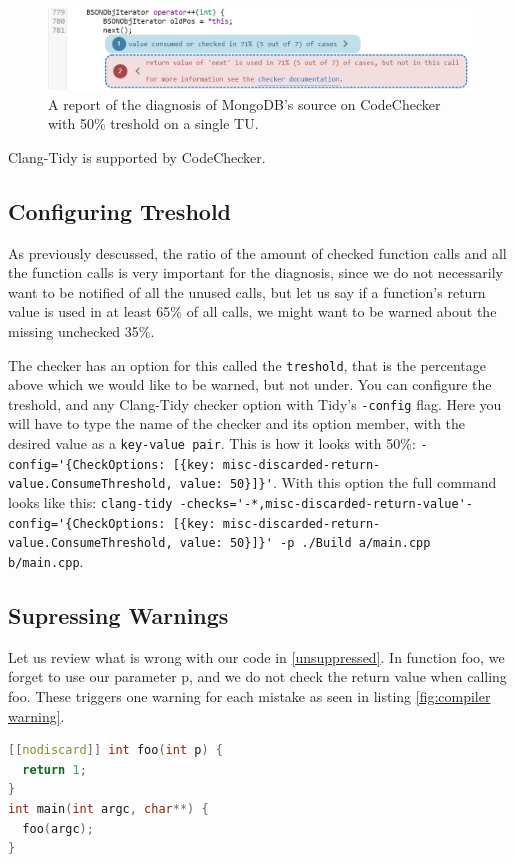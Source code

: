 \begin{figure}[H]
	\includegraphics[width=\linewidth]{images/codechecker_first_ss_mongo_single_50.png}
	\caption{A report of the diagnosis of MongoDB's source on CodeChecker with 50\% treshold on a single TU.}
	\label{fig:mongo50single}
\end{figure}

Clang-Tidy is supported by CodeChecker. \cite{codechecker}

\subsection{Configuring Treshold}

As previously descussed, the ratio of the amount of checked function calls and all the function calls is very important for the
diagnosis, since we do not necessarily want to be notified of all the unused calls, but let us say if a function's return value
is used in at least 65\% of all calls, we might want to be warned about the missing unchecked 35\%.

The checker has an option for this called the \texttt{treshold}, that is the percentage above which we would like to be warned,
but not under.
You can configure the treshold, and any Clang-Tidy checker option with Tidy's \lstinline{-config} flag. Here you will have to type
the name of the checker and its option member, with the desired value as a \texttt{key-value pair}. This is how it looks with 50\%:
\lstinline!-config='{CheckOptions: [{key: misc-discarded-return-value.ConsumeThreshold, value: 50}]}'!. With this option the full
command looks like this:
\lstinline!clang-tidy -checks='-*,misc-discarded-return-value'-config='{CheckOptions: [{key: misc-discarded-return-value.ConsumeThreshold, value: 50}]}' -p ./Build a/main.cpp b/main.cpp!.

\subsection{Supressing Warnings}

Let us review what is wrong with our code in \cref{unsuppressed}. In function foo, we forget to use our parameter p, and we do not
check the return value when calling foo. These triggers one warning for each mistake as seen in listing \cref{fig:compiler warning}.
\begin{lstlisting}[language={C++},caption={An example of both unused parameter and ignored return value with nodiscard.},label={unsuppressed}]
[[nodiscard]] int foo(int p) {
  return 1;
}
int main(int argc, char**) {
  foo(argc);
}
\end{lstlisting}


